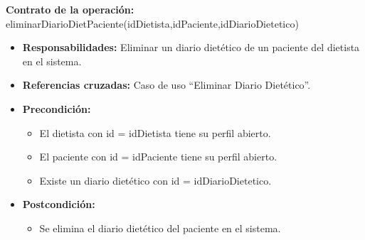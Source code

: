 \textbf{Contrato de la operación:} eliminarDiarioDietPaciente(idDietista,idPaciente,idDiarioDietetico)
\begin{itemize}
\item \textbf{Responsabilidades:} Eliminar un diario dietético de un paciente del dietista en el sistema.
\item \textbf{Referencias cruzadas:} Caso de uso ``Eliminar Diario Dietético''.
\item \textbf{Precondición:}
\begin{itemize}
\item El dietista con id = idDietista tiene su perfil abierto.
\item El paciente con id = idPaciente tiene su perfil abierto.
\item Existe un diario dietético con id = idDiarioDietetico.
\end{itemize}
\item \textbf{Postcondición:}
\begin{itemize}
\item Se elimina el diario dietético del paciente en el sistema.
\end{itemize}
\end{itemize}


